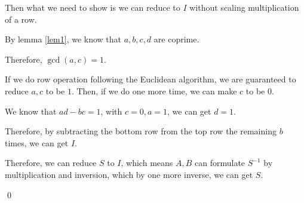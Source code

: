 \documentclass[11pt]{article}
\begin{document}
Then what we need to show is we can reduce to $I$ without scaling multiplication of a row.

By lemma \ref{lem1}, we know that $a,b,c,d$ are coprime.

Therefore, $\operatorname{gcd}(a,c)=1$.

If we do row operation following the Euclidean algorithm,
we are guaranteed to reduce $a,c$ to be $1$.
Then, if we do one more time, we can make $c$ to be $0$.

We know that $ad-bc=1$, with $c=0, a=1$, we can get $d=1$.

Therefore, by subtracting the bottom row from the top row the remaining $b$ times,
we can get $I$.

Therefore, we can reduce $S$ to $I$, which means $A,B$ can 
formulate $S^{-1}$ by multiplication and inversion, 
which by one more inverse, we can get $S$.

\qed
\end{document}
